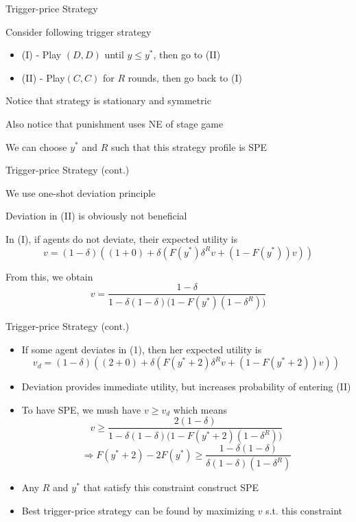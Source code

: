 \documentclass[11pt,aspectratio=169]{beamer}
\begin{document}
  
  \begin{frame} {Trigger-price Strategy}
   \begin{itemizes}[1.2em]
    \item Consider following trigger strategy
    \begin{itemize}
     \item (I) - Play $(D, D)$ until $y \le y^{*}$, then go to (II)
     \item (II) - Play$ (C, C)$ for $R$ rounds, then go back to (I)
    \end{itemize}
    \item Notice that strategy is stationary and symmetric
    \item Also notice that punishment uses \alert{NE of stage game}
    \item We can choose $y^{*}$ and $R$ such that this strategy profile is SPE
   \end{itemizes}
  \end{frame}


  \begin{frame} {Trigger-price Strategy (cont.)}
   \begin{itemizes}
    \item We use one-shot deviation principle
    \item Deviation in (II) is obviously not beneficial
    \item In (I), if agents do not deviate, their \alert{expected utility} is
    $$
    v = (1-\delta)\left((1+0)+\delta\left(F(y^*)\delta^{R} v + (1-F(y^*)) v \right)\right)
    $$
    \item From this, we obtain
    $$
    v = \frac{1-\delta}{1-\delta(1-\delta)\big(1-F(y^*)(1-\delta^{R})\big)}
    $$    
   \end{itemizes}
  \end{frame}

  \begin{frame}{Trigger-price Strategy (cont.)}
   
   \begin{itemize}
    \item If some agent deviates in (1), then her expected utility is
    $$
    v_d = (1-\delta)\left((2+0)+\delta\left(F(y^*+2)\delta^{R} v + (1-F(y^*+2)) v \right)\right)
    $$
    \item Deviation provides immediate utility, but increases probability of entering (II)
    \item To have SPE, we mush have $v \geq v_d$ which means
    $$
    v \ge \frac{2(1-\delta)}{1-\delta(1-\delta)\big(1-F(y^*+2)(1-\delta^{R})\big)}
    $$
    $$
    \Rightarrow F(y^*+2)-2F(y^*) \ge \frac{1-\delta(1-\delta)}{\delta(1-\delta)(1-\delta^{R})}
    $$
    \item  Any $R$ and $y^{*}$ that satisfy this constraint construct SPE
    \item \alert{Best trigger-price strategy} can be found by maximizing $v$ s.t. this constraint
   \end{itemize}
 
  \end{frame}  
  
\end{document}
